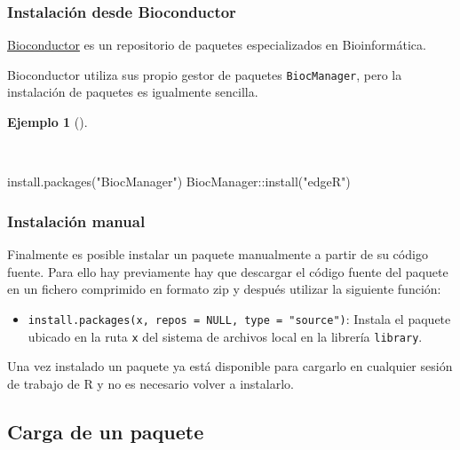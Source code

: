 \documentclass[
  spanish,
  a4paper,
]{scrreport}
\newenvironment{Shaded}{\begin{snugshade}}{\end{snugshade}}
\newcommand{\FunctionTok}[1]{\textcolor[rgb]{0.28,0.35,0.67}{#1}}
\newcommand{\NormalTok}[1]{\textcolor[rgb]{0.00,0.23,0.31}{#1}}
\newcommand{\SpecialCharTok}[1]{\textcolor[rgb]{0.37,0.37,0.37}{#1}}
\newcommand{\StringTok}[1]{\textcolor[rgb]{0.13,0.47,0.30}{#1}}
\providecommand{\tightlist}{%
  \setlength{\itemsep}{0pt}\setlength{\parskip}{0pt}}
\theoremstyle{definition}
\theoremstyle{definition}
\newtheorem{example}{Ejemplo}[chapter]
\theoremstyle{remark}
\begin{document}
\subsubsection{Instalación desde
Bioconductor}\label{instalaciuxf3n-desde-bioconductor}

\href{https://bioconductor.org/}{Bioconductor} es un repositorio de
paquetes especializados en Bioinformática.

Bioconductor utiliza sus propio gestor de paquetes \texttt{BiocManager},
pero la instalación de paquetes es igualmente sencilla.

\begin{example}[]\protect\hypertarget{exm-instalacion-paquetes-bioconductor}{}\label{exm-instalacion-paquetes-bioconductor}

~

\begin{Shaded}
\begin{Highlighting}[]
\FunctionTok{install.packages}\NormalTok{(}\StringTok{"BiocManager"}\NormalTok{)}
\NormalTok{BiocManager}\SpecialCharTok{::}\FunctionTok{install}\NormalTok{(}\StringTok{"edgeR"}\NormalTok{)}
\end{Highlighting}
\end{Shaded}

\end{example}

\subsubsection{Instalación manual}\label{instalaciuxf3n-manual}

Finalmente es posible instalar un paquete manualmente a partir de su
código fuente. Para ello hay previamente hay que descargar el código
fuente del paquete en un fichero comprimido en formato zip y después
utilizar la siguiente función:

\begin{itemize}
\tightlist
\item
  \texttt{install.packages(x,\ repos\ =\ NULL,\ type\ =\ "source")}:
  Instala el paquete ubicado en la ruta \texttt{x} del sistema de
  archivos local en la librería \texttt{library}.
\end{itemize}

Una vez instalado un paquete ya está disponible para cargarlo en
cualquier sesión de trabajo de R y no es necesario volver a instalarlo.

\subsection{Carga de un paquete}\label{carga-de-un-paquete}
\end{document}
